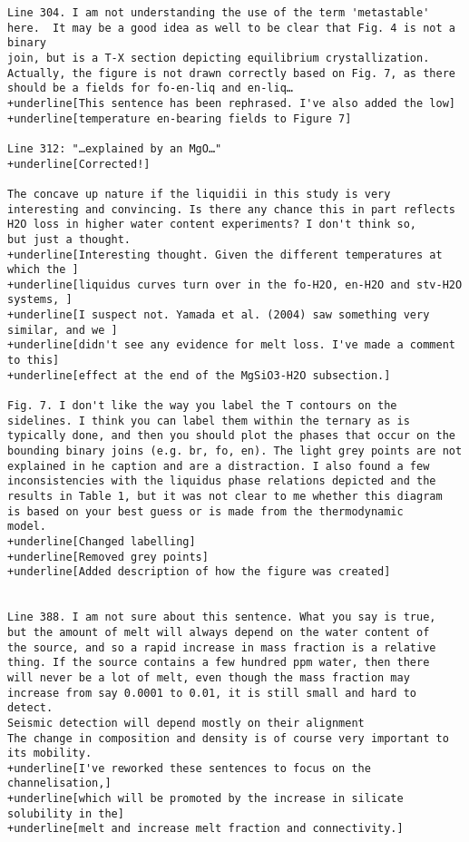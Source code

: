 \documentclass[10pt]{letter}
\begin{document}
\begin{letter}{}
\begin{Verbatim}[commandchars=+\[\]]
Line 304. I am not understanding the use of the term 'metastable'
here.  It may be a good idea as well to be clear that Fig. 4 is not a binary
join, but is a T-X section depicting equilibrium crystallization. 
Actually, the figure is not drawn correctly based on Fig. 7, as there 
should be a fields for fo-en-liq and en-liq…
+underline[This sentence has been rephrased. I've also added the low]
+underline[temperature en-bearing fields to Figure 7]

Line 312: "…explained by an MgO…"
+underline[Corrected!]

The concave up nature if the liquidii in this study is very
interesting and convincing. Is there any chance this in part reflects
H2O loss in higher water content experiments? I don't think so, 
but just a thought.
+underline[Interesting thought. Given the different temperatures at which the ]
+underline[liquidus curves turn over in the fo-H2O, en-H2O and stv-H2O systems, ]
+underline[I suspect not. Yamada et al. (2004) saw something very similar, and we ]
+underline[didn't see any evidence for melt loss. I've made a comment to this]
+underline[effect at the end of the MgSiO3-H2O subsection.]

Fig. 7. I don't like the way you label the T contours on the
sidelines. I think you can label them within the ternary as is
typically done, and then you should plot the phases that occur on the 
bounding binary joins (e.g. br, fo, en). The light grey points are not 
explained in he caption and are a distraction. I also found a few 
inconsistencies with the liquidus phase relations depicted and the 
results in Table 1, but it was not clear to me whether this diagram 
is based on your best guess or is made from the thermodynamic 
model.
+underline[Changed labelling]
+underline[Removed grey points]
+underline[Added description of how the figure was created]

 
Line 388. I am not sure about this sentence. What you say is true, 
but the amount of melt will always depend on the water content of 
the source, and so a rapid increase in mass fraction is a relative
thing. If the source contains a few hundred ppm water, then there 
will never be a lot of melt, even though the mass fraction may
increase from say 0.0001 to 0.01, it is still small and hard to
detect. 
Seismic detection will depend mostly on their alignment 
The change in composition and density is of course very important to
its mobility.
+underline[I've reworked these sentences to focus on the channelisation,]
+underline[which will be promoted by the increase in silicate solubility in the]
+underline[melt and increase melt fraction and connectivity.]


\end{Verbatim}
\end{letter}
\end{document}
